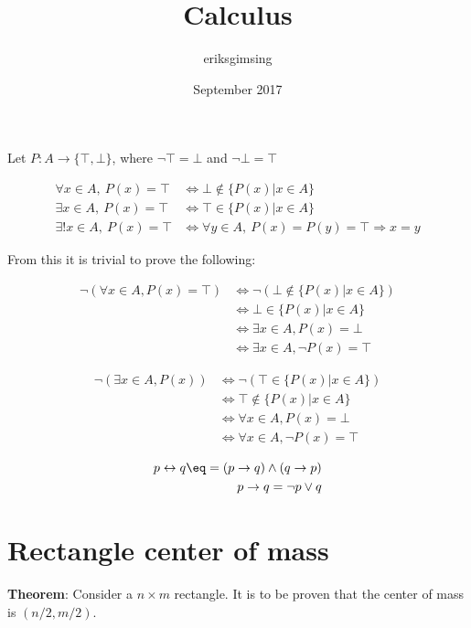 \documentclass{article}
\title{Calculus}
\author{eriksgimsing }
\date{September 2017}
\begin{document}
\maketitle

Let $P: A \rightarrow \{\top,\bot \}$, where $\neg \top = \bot$ and 
$\neg \bot = \top$

\begin{align}
	\forall x \in A,\ P(x) = \top 
	&\Leftrightarrow \bot \notin \{P(x)|x \in A\} \\
	\exists x \in A,\ P(x) = \top
	&\Leftrightarrow \top \in \{P(x)|x \in A\} \\
	\exists! x \in A,\ P(x) = \top &\Leftrightarrow \forall y \in A,\ 
	P(x) = P(y) = \top \Rightarrow x = y
\end{align}

From this it is trivial to prove the following:

\begin{align}
	\neg (\forall x \in A, P(x) = \top) &\Leftrightarrow 
	\neg (\bot \notin \{P(x)|x \in A\}) \\
	&\Leftrightarrow \bot \in \{P(x)|x \in A \} \nonumber \\
	&\Leftrightarrow \exists x \in A, P(x) = \bot \nonumber \\
	&\Leftrightarrow \exists x \in A, \neg P(x) = \top \nonumber
\end{align}

\begin{align}
	\neg (\exists x \in A, P(x)) &\Leftrightarrow 
	\neg ( \top \in \{P(x)|x \in A\} ) \\
	&\Leftrightarrow \top \notin  \{P(x)|x \in A\} \nonumber \\
	&\Leftrightarrow \forall x \in A, P(x) = \bot \nonumber \\
	&\Leftrightarrow \forall x \in A, \neg P(x) = \top \nonumber
\end{align}


\begin{align}
	p \leftrightarrow q \eq = (p \rightarrow q) \land (q \rightarrow p) \\
	p \rightarrow q = \neg p \lor q
\end{align}

\newpage

\section{Rectangle center of mass}
\textbf{Theorem}:
Consider a $n \times m$ rectangle. It is to be proven that the center of 
mass is $(n/2,m/2)$.
\end{document}
